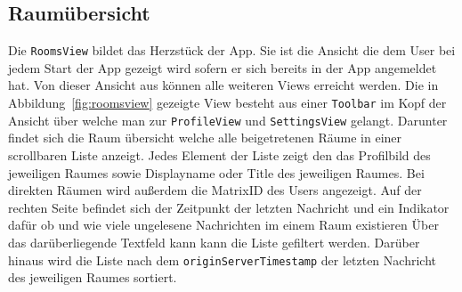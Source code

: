     \newpage
    \subsection{Raumübersicht}\label{subsec:raumubersicht}

    Die \texttt{RoomsView} bildet das Herzstück der App.
    Sie ist die Ansicht die dem User bei jedem Start der App gezeigt wird sofern er sich bereits in der App angemeldet hat.
    Von dieser Ansicht aus können alle weiteren Views erreicht werden.
    Die in Abbildung~\ref{fig:roomsview} gezeigte View besteht aus einer \texttt{Toolbar} im Kopf der Ansicht über welche man zur \texttt{ProfileView} und \texttt{SettingsView} gelangt.
    Darunter findet sich die Raum übersicht welche alle beigetretenen Räume in einer scrollbaren Liste anzeigt.
    Jedes Element der Liste zeigt den das Profilbild des jeweiligen Raumes sowie Displayname oder Title des jeweiligen Raumes.
    Bei direkten Räumen wird außerdem die MatrixID des Users angezeigt.
    Auf der rechten Seite befindet sich der Zeitpunkt der letzten Nachricht und ein Indikator dafür ob und wie viele ungelesene Nachrichten im einem Raum existieren
    Über das darüberliegende Textfeld kann kann die Liste gefiltert werden.
    Darüber hinaus wird die Liste nach dem  \texttt{originServerTimestamp} der letzten Nachricht des jeweiligen Raumes sortiert.

